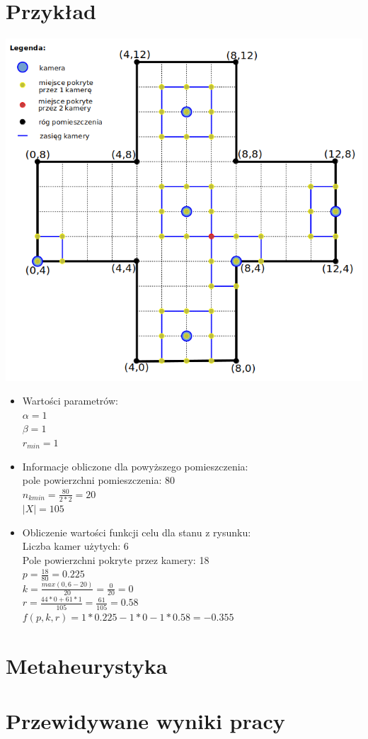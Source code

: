 \documentclass[12pt,a4paper]{article}
\begin{document}
\section{Przykład}
\begin{center}
	\includegraphics[scale=0.6]{img/example.png}
\end{center}


\begin{itemize}
	\item Wartości parametrów:\\
	$\alpha = 1$\\
	$\beta = 1$\\
	$r_{min} = 1$
	\item Informacje obliczone dla powyższego pomieszczenia:\\
	pole powierzchni pomieszczenia: 80\\
	$n_{kmin} = \frac{80}{2*2} = 20$\\
	$|X| = 105$
	\item Obliczenie wartości funkcji celu dla stanu z rysunku:\\
	Liczba kamer użytych: 6\\
	Pole powierzchni pokryte przez kamery: 18\\
	$p = \frac{18}{80} = 0.225$\\
	$k = \frac{max(0, 6-20)}{20} = \frac{0}{20} = 0$\\
	$r = \frac{44*0 + 61*1}{105} = \frac{61}{105} = 0.58$\\
	$f(p, k, r) = 1*0.225 - 1*0 - 1*0.58 = -0.355$
\end{itemize}
\section{Metaheurystyka}

\section{Przewidywane wyniki pracy}
\end{document}

